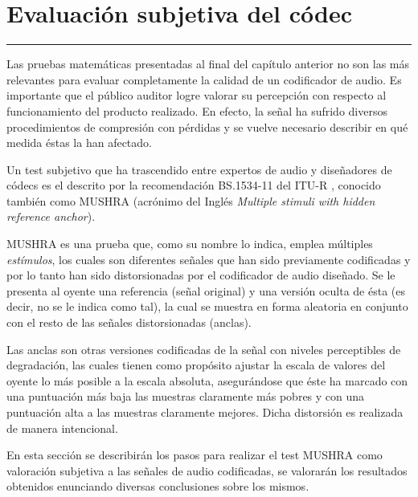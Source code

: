 
\chapter{Evaluación subjetiva del códec}\label{capit:cap2}
\vspace{-2.0325ex}%
\noindent
\rule{\textwidth}{0.5pt}
\vspace{-5.5ex}%
\newcommand{\pushline}{\Indp}%

Las pruebas matemáticas presentadas al final del capítulo anterior no son las más relevantes para evaluar completamente la calidad de un codificador de audio. Es importante que el público auditor logre valorar su percepción con respecto al funcionamiento del producto realizado. En efecto, la señal ha sufrido diversos procedimientos de compresión con pérdidas y se vuelve necesario describir en qué medida éstas la han afectado.

Un test subjetivo que ha trascendido entre expertos de audio y diseñadores de códecs es el descrito por la recomendación BS.1534-11 del ITU-R \cite[]{series2014}, conocido también como MUSHRA (acrónimo del Inglés \emph{Multiple stimuli with hidden reference anchor}). 

MUSHRA es una prueba que, como su nombre lo indica, emplea múltiples \emph{estímulos}, los cuales son diferentes señales que han sido previamente codificadas y por lo tanto han sido distorsionadas por el codificador de audio diseñado. Se le presenta al oyente una referencia (señal original) y una versión oculta de ésta (es decir, no se le indica como tal), la cual se muestra en forma aleatoria en conjunto con el resto de las señales distorsionadas (anclas).

Las anclas son otras versiones codificadas de la señal con niveles perceptibles de degradación, las cuales tienen como propósito ajustar la escala de valores del oyente lo más posible a la escala absoluta, asegurándose que éste ha marcado con una puntuación más baja las muestras claramente más pobres y con una puntuación alta a las muestras claramente mejores. Dicha distorsión es realizada de manera intencional.

En esta sección se describirán los pasos para realizar el test MUSHRA como valoración subjetiva a las señales de audio codificadas, se valorarán los resultados obtenidos enunciando diversas conclusiones sobre los mismos.

